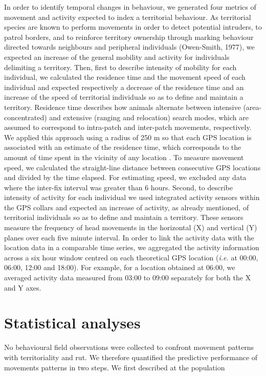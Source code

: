 \documentclass[a4paper,11pt]{article}
\begin{document}
In order to identify temporal changes in behaviour, we generated four
metrics of movement and activity expected to index a territorial
behaviour. As territorial species are known to perform movements in
order to detect potential intruders, to patrol borders, and to
reinforce territory ownership through marking behaviour directed
towards neighbours and peripheral individuals (Owen-Smith, 1977), we
expected an increase of the general mobility and activity for
individuals delimiting a territory. Then, first to describe intensity
of mobility for each individual, we calculated the residence time
\citep{barraquand_animal_2008} and the movement speed of each
individual and expected respectively a decrease of the residence time
and an increase of the speed of territorial individuals so as to
define and maintain a territory. Residence time describes how animals
alternate between intensive (area-concentrated) and extensive (ranging
and relocation) search modes, which are assumed to correspond to
intra-patch and inter-patch movements, respectively. We applied this
approach using a radius of 250 m so that each GPS location is
associated with an estimate of the residence time, which corresponds
to the amount of time spent in the vicinity of any location
\citep{barraquand_animal_2008}. To measure movement speed, we
calculated the straight-line distance between consecutive GPS
locations and divided by the time elapsed. For estimating speed, we
excluded any data where the inter-fix interval was greater than 6
hours. Second, to describe intensity of activity for each individual
we used integrated activity sensors within the GPS collars and
expected an increase of activity, as already mentioned, of territorial
individuals so as to define and maintain a territory. These sensors
measure the frequency of head movements in the horizontal (X) and
vertical (Y) planes over each five minute interval. In order to link
the activity data with the location data in a comparable time series,
we aggregated the activity information across a six hour window
centred on each theoretical GPS location (\textit{i.e.} at 00:00,
06:00, 12:00 and 18:00). For example, for a location obtained at
06:00, we averaged activity data measured from 03:00 to 09:00
separately for both the X and Y axes.

\section*{Statistical analyses}

No behavioural field observations were collected to confront movement patterns with territoriality and rut. We therefore quantified the predictive performance of movements patterns in two steps. We first described at the population
\end{document}

